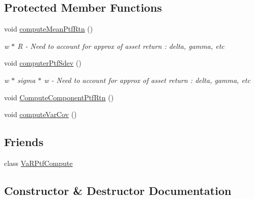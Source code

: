 \subsection*{Protected Member Functions}
\begin{DoxyCompactItemize}
\item 
void \hyperlink{classPortfolio_ad2732b083b90ecd08e5bf26fb38a1834}{compute\+Mean\+Ptf\+Rtn} ()
\begin{DoxyCompactList}\small\item\em w\textquotesingle{} $\ast$ R -\/ Need to account for approx of asset return \+: delta, gamma, etc \end{DoxyCompactList}\item 
void \hyperlink{classPortfolio_aeaba88f92093501fb98c60c83b600529}{computer\+Ptf\+Sdev} ()
\begin{DoxyCompactList}\small\item\em w\textquotesingle{} $\ast$ sigma $\ast$ w -\/ Need to account for approx of asset return \+: delta, gamma, etc \end{DoxyCompactList}\item 
void \hyperlink{classPortfolio_a2824877890ad51d9261935002a6d25c0}{Compute\+Component\+Ptf\+Rtn} ()
\item 
void \hyperlink{classPortfolio_a56baf8410ef9a0c450e5fa558ac4254f}{compute\+Var\+Cov} ()
\end{DoxyCompactItemize}
\subsection*{Friends}
\begin{DoxyCompactItemize}
\item 
class \hyperlink{classPortfolio_a6135a57a82e989f986dd94c3175bc07d}{Va\+R\+Ptf\+Compute}
\end{DoxyCompactItemize}


\subsection{Constructor \& Destructor Documentation}
\hypertarget{classPortfolio_a573528cf895e6c963c37f423486aaac9}{}\label{classPortfolio_a573528cf895e6c963c37f423486aaac9} 
